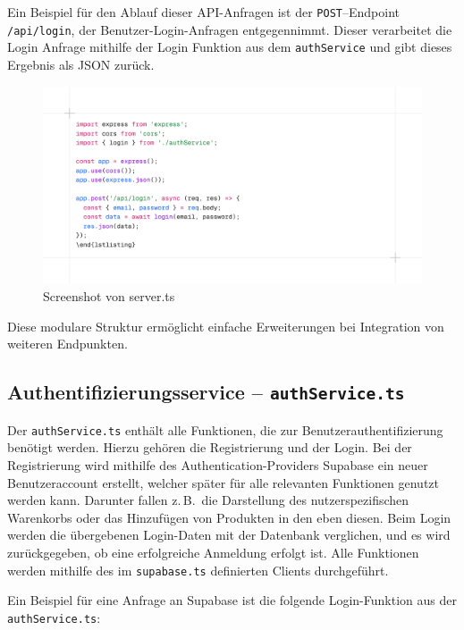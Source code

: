 \documentclass[oneside]{ausarbeitung}
\begin{document}
Ein Beispiel für den Ablauf dieser API-Anfragen ist der \texttt{POST}–Endpoint \texttt{/api/login}, der Benutzer-Login-Anfragen entgegennimmt. Dieser verarbeitet die Login Anfrage mithilfe der Login Funktion aus dem \texttt{authService} und gibt dieses Ergebnis als JSON zurück. 

\begin{figure}[H]
    \centering
    \includegraphics[width=\linewidth]{images/serverts.png}
    \caption{Screenshot von server.ts}
    \label{fig:rcheckout}
\end{figure}

Diese modulare Struktur ermöglicht einfache Erweiterungen bei Integration von weiteren Endpunkten. 

\subsection{Authentifizierungsservice – \texttt{authService.ts}}

Der \texttt{authService.ts} enthält alle Funktionen, die zur Benutzerauthentifizierung benötigt werden. Hierzu gehören die Registrierung und der Login. Bei der Registrierung wird mithilfe des Authentication-Providers Supabase ein neuer Benutzeraccount erstellt, welcher später für alle relevanten Funktionen genutzt werden kann. Darunter fallen z.\,B.\ die Darstellung des nutzerspezifischen Warenkorbs oder das Hinzufügen von Produkten in den eben diesen. Beim Login werden die übergebenen Login-Daten mit der Datenbank verglichen, und es wird zurückgegeben, ob eine erfolgreiche Anmeldung erfolgt ist.
Alle Funktionen werden mithilfe des im \texttt{supabase.ts} definierten Clients durchgeführt.

Ein Beispiel für eine Anfrage an Supabase ist die folgende Login-Funktion aus der \texttt{authService.ts}:
\end{document}

